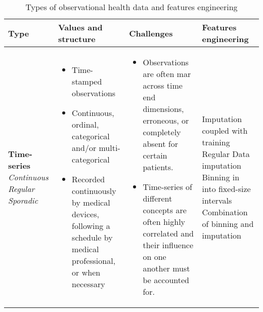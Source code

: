\begin{table}[H]
        \footnotesize
        \caption{Types of observational health data and features engineering}\label{tab:features}
    
        \begin{tabularx}{\textwidth}{@{}p{}p{}p{}X@{}} \toprule
            Type & Values and structure & Challenges & Features engineering\\ \midrule
            
            \textbf{Time-series}\newline
            \textit{Continuous}\newline 
            \textit{Regular}\newline
            \textit{Sporadic}
            &\begin{minipage}[t]{0.3\textwidth}{
            \begin{itemize}[leftmargin=*]  
                \item Time-stamped observations 
                \item Continuous, ordinal, categorical and/or multi-categorical
                \item Recorded continuously by medical devices, following a schedule by medical professional, or when necessary
            \end{itemize}}
            \end{minipage}
            &\begin{minipage}[t]{0.3\textwidth}{
            \begin{itemize}[leftmargin=*]  
                \item Observations are often \gls{mar} across time end dimensions, erroneous, or completely absent for certain patients.
                \item Time-series of different concepts are often highly correlated and their influence on one another must be accounted for.
             \end{itemize}}
             \end{minipage}
            & Imputation coupled with training \newline Regular \newline Data imputation \newline Binning in into fixed-size intervals \newline Combination of binning and imputation \\
            

\end{tabularx}
\end{table}
